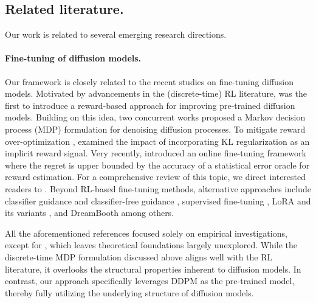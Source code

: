 \documentclass{article}
\begin{document}
%




\subsection*{Related literature.} Our work is related to several emerging research directions.

\paragraph{Fine-tuning of diffusion models.}
Our framework is closely related to the recent studies on fine-tuning diffusion models. Motivated by advancements in the (discrete-time) RL literature, \citet{fan2023optimizing} was the first to introduce a reward-based approach for improving pre-trained diffusion models. Building on this idea, two concurrent works \cite{black2023training,fan2024reinforcement} proposed a Markov decision process (MDP) formulation for denoising diffusion processes. To mitigate reward over-optimization \cite{gao2023scaling}, \citet{fan2024reinforcement} examined the impact of incorporating KL regularization as an implicit reward signal. {Very recently, \citet{uehara2024feedback} introduced an online fine-tuning framework where the regret is upper bounded by the accuracy of a statistical error oracle for reward estimation.} For a comprehensive review of this topic, we direct interested readers to \cite{uehara2024understanding}. Beyond RL-based fine-tuning methods, alternative approaches include classifier guidance \cite{dhariwal2021diffusion} and classifier-free guidance \cite{ho2022classifier}, supervised fine-tuning \cite{lee2023aligning}, LoRA and its variants \cite{hu2021lora,ryu2023low}, and  DreamBooth \cite{ruiz2023dreambooth} among others.
%

All the aforementioned references focused solely on empirical investigations, except for \cite{uehara2024feedback}, which leaves theoretical foundations largely unexplored. While the discrete-time MDP formulation discussed above aligns well with the RL literature, it overlooks the structural properties inherent to diffusion models. In contrast, our approach specifically leverages DDPM as the pre-trained model, thereby fully utilizing the underlying structure of diffusion models.
\end{document}
